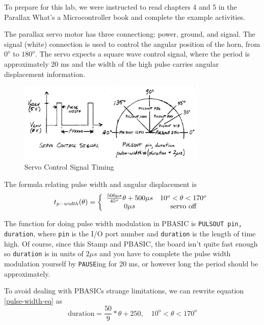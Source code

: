 \documentclass[11pt]{article}
\begin{document}
To prepare for this lab, we were instructed to read chapters 4 and 5 in the Parallax What's a Microcontroller book and complete the example activities.

The parallax servo motor has three connectiong: power, ground, and signal.
The signal (white) connection is used to control the angular position of
the horn, from $0^{o}$ to $180^{o}$.
The servo expects a square wave control signal,
where the period is approximately 20 ms
and the width of the high pulse carries angular displacement information.

\begin{figure}[h!]
\centering
\includegraphics[width=0.8\textwidth]{pulse-width-vs-angular-displacement.pdf}
\caption{Servo Control Signal Timing}
\label{pulse-width-vs-angular-displacement}
\end{figure}

The formula relating pulse width and angular displacement is
\begin{equation}
t_{p-width}(\theta)=\left\{\begin{array}{c c}
\frac{500\mu s}{45^{o}}\theta+500\mu s	&	10^{o}<\theta<170^{o}\\
0\mu s	&	\textrm{servo off}	\\
\end{array}\right.
\label{pulse-width-eq}
\end{equation}

The function for doing pulse width modulation in PBASIC is
\texttt{PULSOUT pin, duration}, where \texttt{pin} is the
I/O port number and \texttt{duration} is the length of time high.
Of course, since this Stamp and PBASIC, the board isn't quite
fast enough so \texttt{duration} is in units of $2\mu s$ and
you have to complete the pulse width modulation yourself by
\texttt{PAUSE}ing for 20 ms, or however long the period should
be approximately.

To avoid dealing with PBASICs strange limitations,
we can rewrite equation \ref{pulse-width-eq} as
\begin{equation}
\textrm{duration}=\frac{50}{9}*\theta+250, \quad 10^{o}<\theta<170^{o}
\end{equation}
\end{document}

